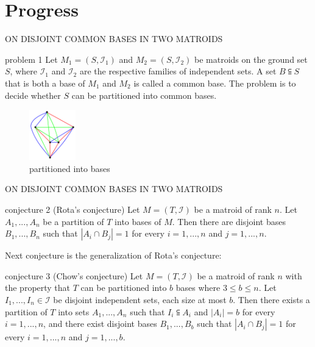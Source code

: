 \documentclass[11pt,xcolor=dvipsnames,table,dvipdfmx]{beamer}
\begin{document}
\section{Progress}
\begin{frame}{ON DISJOINT COMMON BASES IN TWO MATROIDS}
 \begin{block}{problem 1}
  Let $M_1 = (S, \mathcal{I}_1)$ and $M_2 = (S, \mathcal{I}_2)$ be matroids on the ground set $S$, where $\mathcal{I}_1$ and $\mathcal{I}_2$ are the respective families of independent sets. A set $B \subseteqq S$ that is both a base of $M_1$ and $M_2$ is called a common base. The problem is to decide whether $S$ can be partitioned into common bases.
 \end{block}
 \begin{figure}
  \centering
  \includegraphics[width=2cm]{partitioned-graph.png}
  \caption{partitioned into bases}
 \end{figure}
\end{frame}

\begin{frame}{ON DISJOINT COMMON BASES IN TWO MATROIDS}
 \begin{alertblock}{conjecture 2 (Rota's conjecture)}
  Let $M = (T, \mathcal{I})$ be a matroid of rank $n$. Let $A_1 , ..., A_n$ be a partition of $T$ into bases of $M$. Then there are disjoint bases $B_1 , ..., B_n$ such that $|A_i \cap B_j| = 1$ for every $i = 1, ..., n$ and $j = 1, ..., n$.
 \end{alertblock}
 Next conjecture is the generalization of Rota's conjecture:
 \begin{alertblock}{conjecture 3 (Chow's conjecture)}
  Let $M = (T, \mathcal{I})$ be a matroid of rank $n$ with the property that $T$ can be partitioned into $b$ bases where $3 \leq b \leq n$. Let $I_1, ..., I_n \in \mathcal{I}$ be disjoint independent sets, each size at most $b$. Then there exists a partition of $T$ into sets $A_1, ..., A_n$ such that $I_i \subseteqq A_i$ and $|A_i| = b$ for every $i = 1, ..., n$, and there exist disjoint bases $B_1, ..., B_b$ such that $|A_i \cap B_j| = 1$ for every $i = 1, ..., n$ and $j = 1, ..., b$.
 \end{alertblock}
\end{frame}
\end{document}
